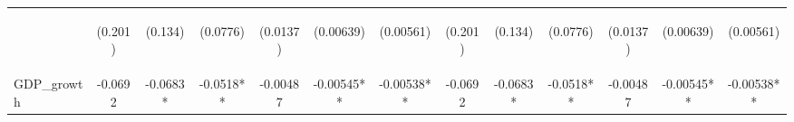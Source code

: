 \documentclass[]{article}
\begin{document}
\begin{center}
\begin{tabular}{lcccccccccccc}
\vspace{4pt} & \begin{footnotesize}(0.201)\end{footnotesize} & \begin{footnotesize}(0.134)\end{footnotesize} & \begin{footnotesize}(0.0776)\end{footnotesize} & \begin{footnotesize}(0.0137)\end{footnotesize} & \begin{footnotesize}(0.00639)\end{footnotesize} & \begin{footnotesize}(0.00561)\end{footnotesize} & \begin{footnotesize}(0.201)\end{footnotesize} & \begin{footnotesize}(0.134)\end{footnotesize} & \begin{footnotesize}(0.0776)\end{footnotesize} & \begin{footnotesize}(0.0137)\end{footnotesize} & \begin{footnotesize}(0.00639)\end{footnotesize} & \begin{footnotesize}(0.00561)\end{footnotesize} \\
GDP\_growth & -0.0692 & -0.0683* & -0.0518** & -0.00487 & -0.00545** & -0.00538** & -0.0692 & -0.0683* & -0.0518** & -0.00487 & -0.00545** & -0.00538** \\

\end{tabular}
\end{center}
\end{document}
